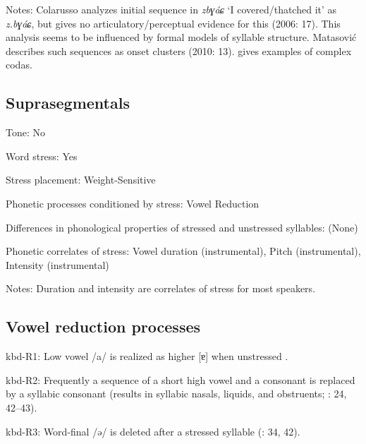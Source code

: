 {\begin{appendixdesc}
\item[Notes:] Colarusso analyzes initial sequence in \textit{zbɣáɕ} ‘I covered/thatched it’ as \textit{z.bɣáɕ}, but gives no articulatory/perceptual evidence for this (2006: 17). This analysis seems to be influenced by formal models of syllable structure. Matasović describes such sequences as onset clusters (2010: 13). \citet{Applebaum2013} gives examples of complex codas.
\end{appendixdesc}
\subsection*{Suprasegmentals}
\begin{appendixdesc}
\item[Tone:] No

\item[Word stress:] Yes

\item[Stress placement:] Weight-Sensitive

\item[Phonetic processes conditioned by stress:] Vowel Reduction

\item[Differences in phonological properties of stressed and unstressed syllables:] (None)

\item[Phonetic correlates of stress:] Vowel duration (instrumental), Pitch (instrumental), Intensity (instrumental)

\item[Notes:] Duration and intensity are correlates of stress for most speakers.
\end{appendixdesc}
\subsection*{Vowel reduction processes}
\begin{appendixdesc}

\item[kbd-R1:] Low vowel /a/ is realized as higher [ɐ] when unstressed \citep[98--99]{Applebaum2013}.

\item[kbd-R2:] Frequently a sequence of a short high vowel and a consonant is replaced by a syllabic consonant (results in syllabic nasals, liquids, and obstruents; \citealt{Kuipers1960}: 24, 42--43).

\item[kbd-R3:] Word-final /ə/ is deleted after a stressed syllable (\citealt{Kuipers1960}: 34, 42).


\end{appendixdesc}}
